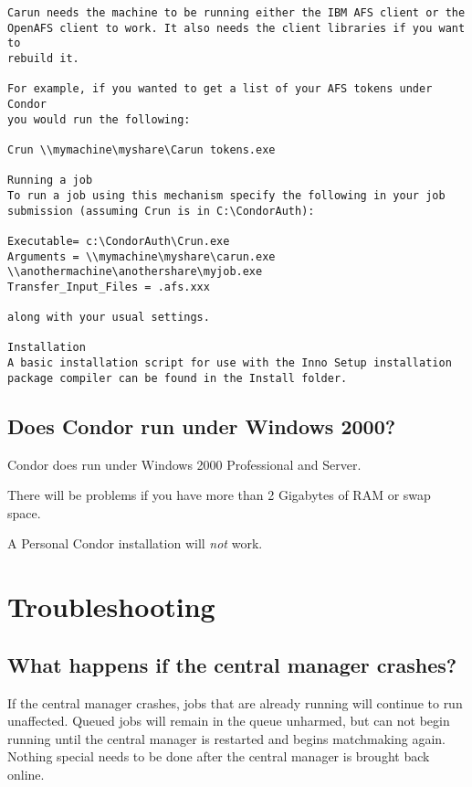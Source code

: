 \begin{verbatim}
Carun needs the machine to be running either the IBM AFS client or the 
OpenAFS client to work. It also needs the client libraries if you want to 
rebuild it.

For example, if you wanted to get a list of your AFS tokens under Condor 
you would run the following:

Crun \\mymachine\myshare\Carun tokens.exe

Running a job
To run a job using this mechanism specify the following in your job 
submission (assuming Crun is in C:\CondorAuth):

Executable= c:\CondorAuth\Crun.exe
Arguments = \\mymachine\myshare\carun.exe 
\\anothermachine\anothershare\myjob.exe
Transfer_Input_Files = .afs.xxx

along with your usual settings.

Installation
A basic installation script for use with the Inno Setup installation 
package compiler can be found in the Install folder.
\end{verbatim}

\subsection{Does Condor run under Windows 2000?}

Condor does run under Windows 2000 Professional and Server.

There will be problems if 
you have more than 2 Gigabytes of RAM or swap space.

A Personal Condor installation will \emph{not} work.

\section{Troubleshooting}

\subsection{What happens if the central manager crashes?} 

If the central manager crashes, jobs that are already running will
continue to run unaffected.
Queued jobs will remain in the queue unharmed, but can not begin
running until the central manager is restarted and begins matchmaking
again.
Nothing special needs to be done after the central manager is brought
back online.


